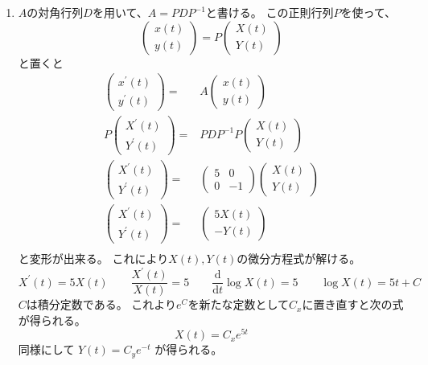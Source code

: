\documentclass[12pt,b5paper]{ltjsarticle}
\begin{document}
\begin{enumerate}
      \dotfill
 \item
      $A$の対角行列$D$を用いて、$A=PDP^{-1}$と書ける。
      この正則行列$P$を使って、
      \begin{equation}
       \begin{pmatrix} x(t)\\y(t) \end{pmatrix}=P\begin{pmatrix} X(t)\\Y(t) \end{pmatrix}
       \label{tr_var}
      \end{equation}
      と置くと
      \begin{align}
       \begin{pmatrix} x^{\prime}(t)\\y^\prime(t) \end{pmatrix} =& A\begin{pmatrix} x(t)\\y(t) \end{pmatrix}\\
       P\begin{pmatrix} X^{\prime}(t)\\Y^\prime(t) \end{pmatrix} =& PDP^{-1}P\begin{pmatrix} X(t)\\Y(t) \end{pmatrix}\\
       \begin{pmatrix} X^{\prime}(t)\\Y^\prime(t) \end{pmatrix} =& \begin{pmatrix} 5&0\\0&-1 \end{pmatrix}\begin{pmatrix} X(t)\\Y(t) \end{pmatrix}\\
       \begin{pmatrix} X^{\prime}(t)\\Y^\prime(t) \end{pmatrix} =& \begin{pmatrix} 5X(t)\\-Y(t) \end{pmatrix}\\
      \end{align}
      と変形が出来る。
      これにより$X(t),Y(t)$の微分方程式が解ける。
      \begin{equation}
       X^{\prime}(t) = 5X(t)
       \qquad \frac{X^{\prime}(t)}{X(t)} = 5
       \qquad \frac{\mathrm{d}}{\mathrm{d}t}\log X(t) =5
       \qquad \log X(t) =5t +C
      \end{equation}
      $C$は積分定数である。
      これより$e^C$を新たな定数として$C_x$に置き直すと次の式が得られる。
      \begin{equation}
       X(t) =C_xe^{5t}
      \end{equation}
      同様にして
      $Y(t) =C_ye^{-t}$
      が得られる。


\end{enumerate}
\end{document}
